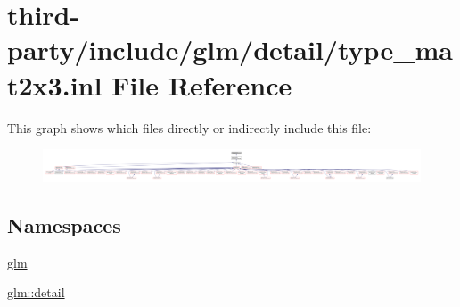 \hypertarget{type__mat2x3_8inl}{}\section{third-\/party/include/glm/detail/type\+\_\+mat2x3.inl File Reference}
\label{type__mat2x3_8inl}
This graph shows which files directly or indirectly include this file\+:
\nopagebreak
\begin{figure}[H]
\begin{center}
\leavevmode
\includegraphics[width=350pt]{type__mat2x3_8inl__dep__incl}
\end{center}
\end{figure}
\subsection*{Namespaces}
\begin{DoxyCompactItemize}
\item 
 \hyperlink{namespaceglm}{glm}
\item 
 \hyperlink{namespaceglm_1_1detail}{glm\+::detail}
\end{DoxyCompactItemize}

